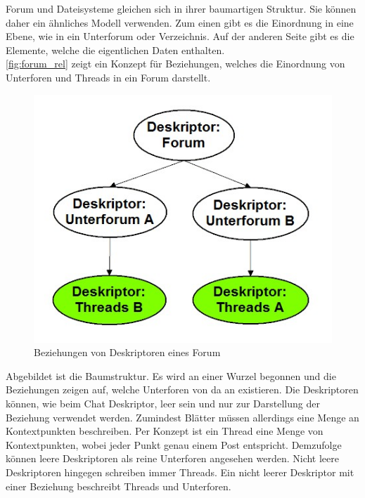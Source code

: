 \documentclass[a4paper]{article}
\begin{document}
	Forum und Dateisysteme gleichen sich in ihrer baumartigen Struktur. Sie können
	daher ein ähnliches Modell verwenden. Zum einen gibt es die Einordnung
	in eine Ebene, wie in ein Unterforum oder Verzeichnis. Auf der anderen
	Seite gibt es die Elemente, welche die eigentlichen Daten enthalten. \\
	
	\autoref{fig:forum_rel} zeigt ein Konzept für Beziehungen, welches die
	Einordnung von Unterforen und Threads in ein Forum darstellt.
	
	\begin{figure}[H]
		\centerline{
			\includegraphics[scale=0.49]{../Bilder/forum_rel.jpg}
		}
		\caption{Beziehungen von Deskriptoren eines Forum}
		\label{fig:forum_rel}
	\end{figure}
	
	Abgebildet ist die Baumstruktur. Es wird an einer Wurzel begonnen und
	die Beziehungen zeigen auf, welche Unterforen von da an existieren. Die
	Deskriptoren können, wie beim Chat Deskriptor, leer sein und nur zur
	Darstellung der Beziehung verwendet werden. Zumindest Blätter müssen
	allerdings eine Menge an Kontextpunkten beschreiben. Per Konzept ist ein Thread 
	eine Menge von Kontextpunkten, wobei jeder Punkt genau einem Post entspricht.
	Demzufolge können leere Deskriptoren als reine Unterforen angesehen werden.
	Nicht leere Deskriptoren hingegen schreiben immer Threads. Ein nicht
	leerer Deskriptor mit einer Beziehung beschreibt Threads und Unterforen. \\
	
\end{document}
